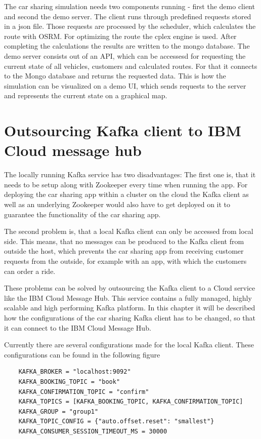The car sharing simulation needs two components running - first the demo client and second the demo server. The client runs through predefined requests stored in a json file. Those requests are processed by the scheduler, which calculates the route with OSRM. For optimizing the route the cplex engine is used. After completing the calculations the results are written to the mongo database. The demo server consists out of an API, which can be accessesd for requesting the current state of all vehicles, customers and calculated routes. For that it connects to the Mongo database and returns the requested data. This is how the simulation can be visualized on a demo UI, which sends requests to the server and represents the current state on a graphical map.


\section{Outsourcing Kafka client to IBM Cloud message hub}

The locally running Kafka service has two disadvantages: The first one is, that it needs to be setup along with Zookeeper every time when running the app. For deploying the car sharing app within a cluster on the cloud the Kafka client as well as an underlying Zookeeper would also have to get deployed on it to guarantee the functionality of the car sharing app.

The second problem is, that a local Kafka client can only be accessed from local side. This means, that no messages can be produced to the Kafka client from outside the host, which prevents the car sharing app from receiving customer requests from the outside, for example with an app, with which the customers can order a ride.

These problems can be solved by outsourcing the 	Kafka client to a Cloud service like the IBM Cloud Message Hub. This service contains a fully managed, highly scalable and high performing Kafka platform. In this chapter it will be described how the configurations of the car sharing Kafka client has to be changed, so that it can connect to the IBM Cloud Message Hub.


Currently there are several configurations made for the local Kafka client. These configurations can be found in the following figure

\begin{lstlisting}
    KAFKA_BROKER = "localhost:9092"
    KAFKA_BOOKING_TOPIC = "book"
    KAFKA_CONFIRMATION_TOPIC = "confirm"
    KAFKA_TOPICS = [KAFKA_BOOKING_TOPIC, KAFKA_CONFIRMATION_TOPIC]
    KAFKA_GROUP = "group1"
    KAFKA_TOPIC_CONFIG = {"auto.offset.reset": "smallest"}
    KAFKA_CONSUMER_SESSION_TIMEOUT_MS = 30000
\end{lstlisting}

